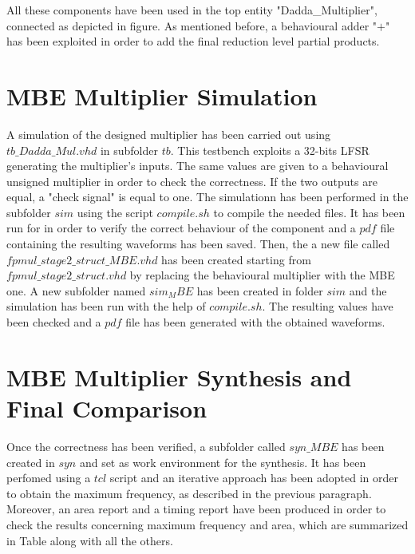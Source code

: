 All these components have been used in the top entity "Dadda\_Multiplier", connected as depicted in
figure. As mentioned before, a behavioural adder "$+$" has been exploited in order to add the final
reduction level partial products.

\section{MBE Multiplier Simulation}

A simulation of the designed multiplier has been carried out using $tb\_Dadda\_Mul.vhd$ in subfolder $tb$. 
This testbench exploits a 32-bits LFSR generating the multiplier's inputs. The same values are given to a behavioural
unsigned multiplier in order to check the correctness. If the two outputs are equal, a "check signal" is equal to one.
The simulationn has been performed in the subfolder $sim$ using the script $compile.sh$ to compile the needed files.
It has been run for in order to verify the correct behaviour of the component and a $pdf$ file containing the resulting
waveforms has been saved.
\newline
\newline
Then, the a new file called $fpmul\_stage2\_struct\_MBE.vhd$ has been created starting from $fpmul\_stage2\_struct.vhd$
by replacing the behavioural multiplier with the MBE one. A new subfolder named $sim_MBE$ has been created in folder $sim$ and
the simulation has been run with the help of $compile.sh$. The resulting values have been checked and a $pdf$ file has been generated
with the obtained waveforms.

\section{MBE Multiplier Synthesis and Final Comparison}

Once the correctness has been verified, a subfolder called $syn\_MBE$ has been created in $syn$ and set as work environment for the
synthesis. It has been perfomed using a $tcl$ script and an iterative approach has been adopted in order to obtain the maximum frequency, as described in the previous paragraph. Moreover, an area report and a timing report have been produced in order to check the results concerning maximum frequency and area, which are summarized in Table along with all the others.



